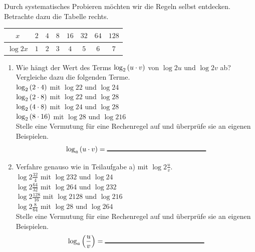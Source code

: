 \documentclass[11pt,oneside]{article}
\begin{document}
	\begin{aufgabe}
		Durch systematisches Probieren möchten wir die Regeln selbst entdecken. Betrachte dazu die Tabelle rechts.
		\begingroup
		\renewcommand{\arraystretch}{1.5}
		\begin{table}[H]
			\centering
			\begin{tabular}{c|c|c|c|c|c|c|c}
				$x$ & $2$ & $4$ & $8$ & $16$ & $32$ & $64$ & $128$ \\\hline
				$\log{2}{x}$ & $1$ & $2$ & $3$ & $4$ & $5$ & $6$ & $7$
			\end{tabular}
		\end{table}
		\endgroup
		\begin{enumerate}[label=\alph*)]
			\item Wie hängt der Wert des Terms $\log{2}{u\*v}$ von $\log{2}{u}$ und $\log{2}{v}$ ab? Vergleiche dazu die folgenden Terme.\\
			$\log{2}{2\*4}$ mit $\log{2}{2}$ und $\log{2}{4}$\vspace{5pt}\\
			$\log{2}{2\*8}$ mit $\log{2}{2}$ und $\log{2}{8}$\vspace{5pt}\\
			$\log{2}{4\*8}$ mit $\log{2}{4}$ und $\log{2}{8}$\vspace{5pt}\\
			$\log{2}{8\*16}$ mit $\log{2}{8}$ und $\log{2}{16}$\vspace{5pt}\\
			Stelle eine Vermutung für eine Rechenregel auf und überprüfe sie an eigenen Beispielen.
			\[\log{a}{u\*v}=\gap{5}\]
			\item Verfahre genauso wie in Teilaufgabe a) mit $\log{2}{\frac{u}{v}}$.\\
			$\log{2}{\frac{32}{4}}$ mit $\log{2}{32}$ und $\log{2}{4}$\vspace{5pt}\\
			$\log{2}{\frac{64}{32}}$ mit $\log{2}{64}$ und $\log{2}{32}$\vspace{5pt}\\
			$\log{2}{\frac{128}{16}}$ mit $\log{2}{128}$ und $\log{2}{16}$\vspace{5pt}\\
			$\log{2}{\frac{8}{64}}$ mit $\log{2}{8}$ und $\log{2}{64}$\vspace{5pt}\\
			Stelle eine Vermutung für eine Rechenregel auf und überprüfe sie an eigenen Beispielen.
			\[\log{a}{\frac{u}{v}}=\gap{5}\]
		\end{enumerate}
	\end{aufgabe}
\end{document}
